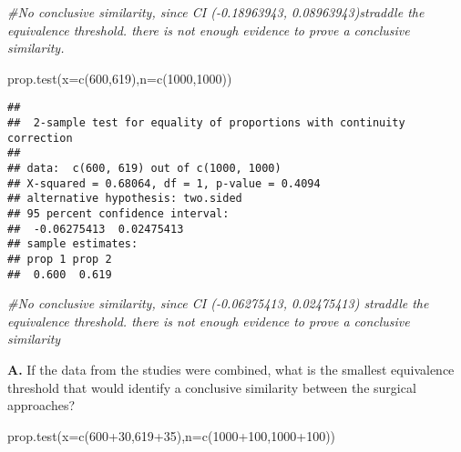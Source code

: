 \documentclass[
]{article}
\newenvironment{Shaded}{\begin{snugshade}}{\end{snugshade}}
\newcommand{\AttributeTok}[1]{\textcolor[rgb]{0.77,0.63,0.00}{#1}}
\newcommand{\CommentTok}[1]{\textcolor[rgb]{0.56,0.35,0.01}{\textit{#1}}}
\newcommand{\DecValTok}[1]{\textcolor[rgb]{0.00,0.00,0.81}{#1}}
\newcommand{\FunctionTok}[1]{\textcolor[rgb]{0.00,0.00,0.00}{#1}}
\newcommand{\NormalTok}[1]{#1}
\newcommand{\SpecialCharTok}[1]{\textcolor[rgb]{0.00,0.00,0.00}{#1}}
\begin{document}
\begin{Shaded}
\begin{Highlighting}[]
\CommentTok{\#No conclusive similarity, since CI ({-}0.18963943, 0.08963943)straddle the equivalence threshold. there is not enough evidence to prove a conclusive similarity.}
\end{Highlighting}
\end{Shaded}

\begin{Shaded}
\begin{Highlighting}[]
\FunctionTok{prop.test}\NormalTok{(}\AttributeTok{x=}\FunctionTok{c}\NormalTok{(}\DecValTok{600}\NormalTok{,}\DecValTok{619}\NormalTok{),}\AttributeTok{n=}\FunctionTok{c}\NormalTok{(}\DecValTok{1000}\NormalTok{,}\DecValTok{1000}\NormalTok{))}
\end{Highlighting}
\end{Shaded}

\begin{verbatim}
## 
##  2-sample test for equality of proportions with continuity correction
## 
## data:  c(600, 619) out of c(1000, 1000)
## X-squared = 0.68064, df = 1, p-value = 0.4094
## alternative hypothesis: two.sided
## 95 percent confidence interval:
##  -0.06275413  0.02475413
## sample estimates:
## prop 1 prop 2 
##  0.600  0.619
\end{verbatim}

\begin{Shaded}
\begin{Highlighting}[]
\CommentTok{\#No conclusive similarity, since CI ({-}0.06275413, 0.02475413) straddle the equivalence threshold. there is not enough evidence to prove a conclusive similarity}
\end{Highlighting}
\end{Shaded}

\textbf{A.} If the data from the studies were combined, what is the
smallest equivalence threshold that would identify a conclusive
similarity between the surgical approaches?

\begin{Shaded}
\begin{Highlighting}[]
\FunctionTok{prop.test}\NormalTok{(}\AttributeTok{x=}\FunctionTok{c}\NormalTok{(}\DecValTok{600}\SpecialCharTok{+}\DecValTok{30}\NormalTok{,}\DecValTok{619}\SpecialCharTok{+}\DecValTok{35}\NormalTok{),}\AttributeTok{n=}\FunctionTok{c}\NormalTok{(}\DecValTok{1000}\SpecialCharTok{+}\DecValTok{100}\NormalTok{,}\DecValTok{1000}\SpecialCharTok{+}\DecValTok{100}\NormalTok{))}
\end{Highlighting}
\end{Shaded}
\end{document}
